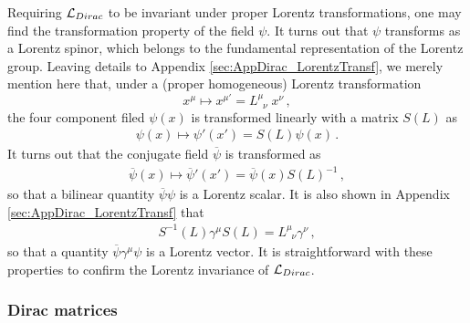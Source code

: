 Requiring ${\cal L}_{Dirac}$ to be invariant under proper Lorentz transformations,
one may find the transformation property of the field $\psi$.
It turns out that $\psi$ transforms as a Lorentz spinor, which 
belongs to the fundamental representation of the Lorentz group.
Leaving details to Appendix \ref{sec:AppDirac_LorentzTransf},
we merely mention here that, under a (proper homogeneous) Lorentz transformation 
\begin{equation}
x^\mu \mapsto x^{\mu'} = L^\mu_{\;\;\nu}\; x^\nu\,,
\end{equation}
the four component filed $\psi(x)$ is transformed linearly 
with a matrix $S(L)$ as
\begin{eqnarray}
\psi(x)
\mapsto
\psi'(x') 
= 
S(L) \psi(x)\,.
\end{eqnarray}
It turns out that the conjugate field $\overline{\psi}$
is transformed as
\begin{eqnarray}
\overline{\psi}(x)
\mapsto
\overline{\psi}'(x')
= 
\overline{\psi}(x) S(L)^{-1}\,,
\end{eqnarray}
so that a bilinear quantity $\overline{\psi} \psi$ is a Lorentz scalar.
It is also shown in Appendix \ref{sec:AppDirac_LorentzTransf} that
\begin{eqnarray}
S^{-1}(L) \gamma^\mu S(L) = L^\mu_{\;\;\nu} \gamma^\nu \,,
\label{eqn:LorentzTransfgamma}
\end{eqnarray}
so that a quantity $\overline{\psi} \gamma^\mu \psi$ is a Lorentz vector.
It is straightforward with these properties to confirm the Lorentz invariance of ${\cal L}_{Dirac}$.


\subsubsection{Dirac matrices}

